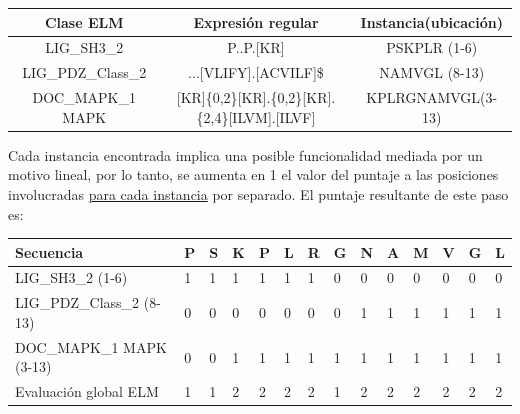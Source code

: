 \noindent 
\begin{tabular}{c|c|c} 
\textbf{Clase ELM} & \textbf{Expresión regular} & \textbf{Instancia(ubicación)}\\ \hline
LIG\_SH3\_2 & P..P.[KR] & PSKPLR (1-6)\\ 
LIG\_PDZ\_Class\_2 & ...[VLIFY].[ACVILF]\$ & NAMVGL (8-13)  \\
DOC\_MAPK\_1 MAPK  & [KR]\{0,2\}[KR].\{0,2\}[KR].\{2,4\}[ILVM].[ILVF] & KPLRGNAMVGL(3-13)
\end{tabular}


Cada instancia encontrada implica una posible funcionalidad mediada por un motivo lineal, por lo tanto, se aumenta en 1 el valor del puntaje a las posiciones involucradas \underline{para cada instancia} por separado.
El puntaje resultante de este paso es:


\begin{tabular}{llllllllllllll} 
\hline
Secuencia & \textbf{P} & \textbf{S} & \textbf{K} & \textbf{P} & \textbf{L} & \textbf{R} & \textbf{G} & \textbf{N} & \textbf{A} & \textbf{M} & \textbf{V} & \textbf{G} & \textbf{L} \\ \hline
LIG\_SH3\_2 (1-6) & 1 & 1 & 1 & 1 & 1 & 1 & 0 & 0 & 0 & 0 & 0 & 0 & 0\\ \hline
LIG\_PDZ\_Class\_2 (8-13) & 0 & 0 & 0 & 0 & 0 & 0 & 0 & 1 & 1 & 1 & 1 & 1 & 1 \\ \hline
DOC\_MAPK\_1 MAPK (3-13)  & 0 & 0 & 1 & 1 & 1 & 1 & 1 & 1 & 1 & 1 & 1 & 1 & 1 \\ \hline
Evaluación global ELM & 1 & 1 & 2 & 2 & 2 & 2 & 1 & 2 & 2 & 2 & 2 & 2 & 2\\ \hline
\end{tabular}

